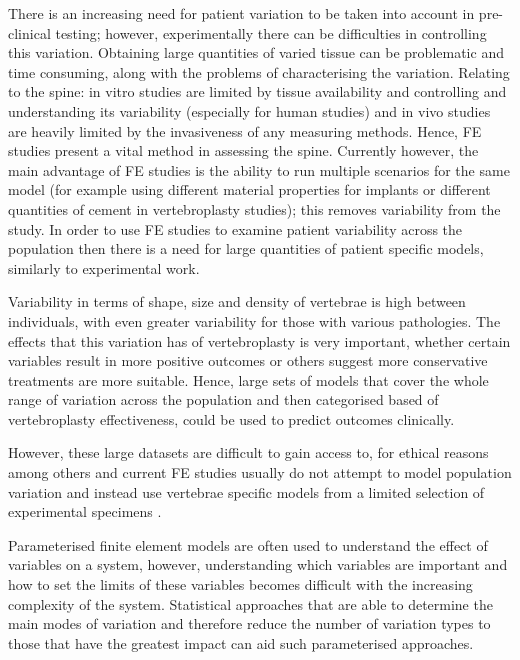 There is an increasing need for patient variation to be taken into
account in pre-clinical testing; however, experimentally there can be
difficulties in controlling this variation. Obtaining large quantities
of varied tissue can be problematic and time consuming, along with the
problems of characterising the variation. Relating to the spine: in
vitro studies are limited by tissue availability and controlling and
understanding its variability (especially for human studies) and in vivo
studies are heavily limited by the invasiveness of any measuring
methods. Hence, FE studies present a vital method in assessing the
spine. Currently however, the main advantage of FE studies is the
ability to run multiple scenarios for the same model (for example using different material properties for implants or different quantities of cement in vertebroplasty studies); this removes variability from the study. In
order to use FE studies to examine patient variability across the
population then there is a need for large quantities of patient specific
models, similarly to experimental work.

Variability in terms of shape, size and density of vertebrae is high
between individuals, with even greater variability for those with
various pathologies. The effects that this variation has of
vertebroplasty is very important, whether certain variables result in
more positive outcomes or others suggest more conservative treatments
are more suitable. Hence, large sets of models that cover the whole
range of variation across the population and then categorised based of
vertebroplasty effectiveness, could be used to predict outcomes
clinically.

However, these large datasets are difficult to gain access to,
for ethical reasons among others \cite{Grassi2014} and current FE studies
usually
do not attempt to model population variation and instead use vertebrae
specific models from a limited selection of experimental specimens
\cite{Buckley2006, Kinzl2012, Wijayathunga2008, Chevalier2008}. 

Parameterised finite element models are often used to understand the effect of variables on a system, however, understanding which variables are important and how to set the limits of these variables becomes difficult with the increasing complexity of the system.
Statistical approaches that are able to determine the main modes of variation and therefore reduce the number of variation types to those that have the greatest impact can aid such parameterised approaches.

